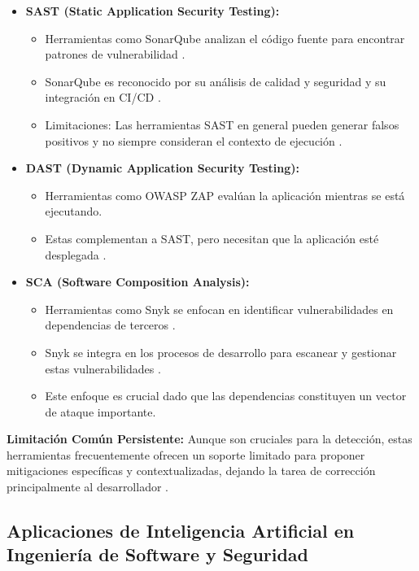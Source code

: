 \begin{itemize}
    \item \textbf{SAST (Static Application Security Testing):} 
    \begin{itemize}
        \item Herramientas como SonarQube analizan el código fuente para encontrar patrones de vulnerabilidad \cite{SonarSourceDocSonarQube}.
        \item SonarQube es reconocido por su análisis de calidad y seguridad y su integración en CI/CD \cite{SonarSourceDocSonarQube}.
        \item Limitaciones: Las herramientas SAST en general pueden generar falsos positivos y no siempre consideran el contexto de ejecución \cite{Kumar2022DevSecOpsReview}.
    \end{itemize}
    
    \item \textbf{DAST (Dynamic Application Security Testing):}
    \begin{itemize}
        \item Herramientas como OWASP ZAP evalúan la aplicación mientras se está ejecutando.
        \item Estas complementan a SAST, pero necesitan que la aplicación esté desplegada \cite{Kumar2022DevSecOpsReview}.
    \end{itemize}
    
    \item \textbf{SCA (Software Composition Analysis):}
    \begin{itemize}
        \item Herramientas como Snyk se enfocan en identificar vulnerabilidades en dependencias de terceros \cite{SnykDoc}.
        \item Snyk se integra en los procesos de desarrollo para escanear y gestionar estas vulnerabilidades \cite{SnykDoc}.
        \item Este enfoque es crucial dado que las dependencias constituyen un vector de ataque importante.
    \end{itemize}
\end{itemize}

\textbf{Limitación Común Persistente:} Aunque son cruciales para la detección, estas herramientas frecuentemente ofrecen un soporte limitado para proponer mitigaciones específicas y contextualizadas, dejando la tarea de corrección principalmente al desarrollador \cite{Kumar2022DevSecOpsReview}.

\subsection{Aplicaciones de Inteligencia Artificial en Ingeniería de Software y Seguridad}

